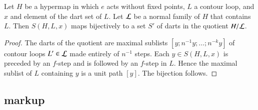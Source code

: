 \begin{lemma}\label{lemma:flag-set-quotient}
Let $H$ be a hypermap in which $e$ acts without fixed points, 
$L$ a contour loop, and $x$ and element of the dart set of $L$.
Let ${\cal L}$ be a normal family of $H$ that contains $L$.
Then $S(H,L,x)$ maps bijectively to a set $S'$ of darts in the quotient $H/{\cal L}$.
\end{lemma}

\begin{proof} The darts of the quotient are maximal sublists
  $[y;n^{-1} y;\ldots;n^{-k} y]$ of contour loops $L'\in {\cal L}$
  made entirely of $n^{-1}$ steps.  Each $y\in S(H,L,x)$ is preceded
  by an $f$-step and is followed by an $f$-step in $L$.  Hence the
  maximal sublist of $L$ containing $y$ is a unit path $[y]$.  The
  bijection follows.
\end{proof}


\subsection{markup}\label{sec:face-insert}
%






